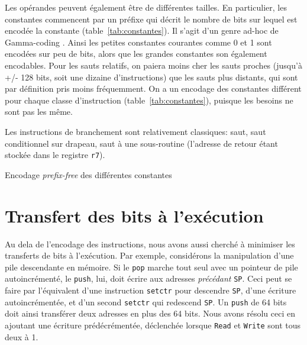 \documentclass[architecture]{compas2018}
\begin{document}
Les opérandes peuvent également être de différentes tailles.
 En particulier, les constantes commencent par un préfixe qui décrit le nombre de bits sur lequel est encodée  la constante (table~\ref{tab:constantes}).
Il s'agit d'un genre ad-hoc de Gamma-coding \cite{1975-Elias-Gammacoding}. 
Ainsi les petites constantes courantes comme 0 et 1 sont encodées sur peu de bits, alors que les grandes constantes son également encodables.
Pour les sauts relatifs, on paiera moins cher les sauts proches (jusqu'à +/- 128 bits, soit une dizaine d'instructions) que les sauts plus distants, qui sont par définition pris moins fréquemment.
On a un encodage des constantes différent pour chaque classe d'instruction (table~\ref{tab:constantes}), puisque les besoins ne sont pas les même.

Les instructions de branchement sont relativement classiques: saut, saut conditionnel sur drapeau, saut à une sous-routine (l'adresse de retour étant stockée dans le registre \texttt{r7}).


\begin{table}[t]
  \centering
  \caption{Encodage \emph{prefix-free} des différentes constantes  \label{tab:constantes}}
  \prefree
\end{table}

\section{Transfert des bits à l'exécution \label{sec:transfertsexec}}

Au dela de l'encodage des instructions, nous avons aussi cherché à minimiser les transferts de bits à l'exécution.
Par exemple, considérons la manipulation d'une pile descendante en mémoire.
Si le \texttt{pop} marche tout seul avec un pointeur de pile autoincrémenté, le \texttt{push}, lui, doit écrire aux adresses \emph{précédant} \texttt{SP}.
Ceci peut se faire par l'équivalent d'une instruction \texttt{setctr} pour descendre \texttt{SP}, d'une écriture autoincrémentée, et d'un second \texttt{setctr} qui redescend \texttt{SP}.
Un \texttt{push} de 64 bits doit  ainsi transférer deux adresses en plus des 64 bits.
Nous avons résolu ceci en ajoutant une écriture prédécrémentée, déclenchée lorsque \texttt{Read} et \texttt{Write} sont tous deux à 1.
\end{document}
